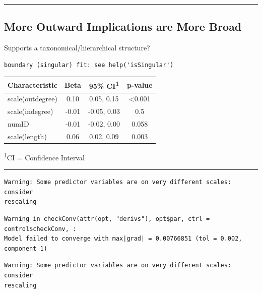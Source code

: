 \documentclass[
  .7em,
  letterpaper,
  DIV=11,
  numbers=noendperiod]{scrartcl}
\begin{document}
\begin{center}\rule{0.5\linewidth}{0.5pt}\end{center}

\hypertarget{more-outward-implications-are-more-broad}{%
\subsection{More Outward Implications are More
Broad}\label{more-outward-implications-are-more-broad}}

Supports a taxonomical/hierarchical structure?

\begin{verbatim}
boundary (singular) fit: see help('isSingular')
\end{verbatim}

\captionsetup[table]{labelformat=empty,skip=1pt}
\setlength{\LTpost}{0mm}
\begin{longtable}{lccc}
\toprule
\textbf{Characteristic} & \textbf{Beta} & \textbf{95\% CI}\textsuperscript{1} & \textbf{p-value} \\ 
\midrule
scale(outdegree) & 0.10 & 0.05, 0.15 & <0.001 \\ 
scale(indegree) & -0.01 & -0.05, 0.03 & 0.5 \\ 
numID & -0.01 & -0.02, 0.00 & 0.058 \\ 
scale(length) & 0.06 & 0.02, 0.09 & 0.003 \\ 
\bottomrule
\end{longtable}
\begin{minipage}{\linewidth}
\textsuperscript{1}CI = Confidence Interval\\
\end{minipage}

\begin{center}\rule{0.5\linewidth}{0.5pt}\end{center}

\begin{verbatim}
Warning: Some predictor variables are on very different scales: consider
rescaling
\end{verbatim}

\begin{verbatim}
Warning in checkConv(attr(opt, "derivs"), opt$par, ctrl = control$checkConv, :
Model failed to converge with max|grad| = 0.00766851 (tol = 0.002, component 1)
\end{verbatim}

\begin{verbatim}
Warning: Some predictor variables are on very different scales: consider
rescaling
\end{verbatim}
\end{document}
